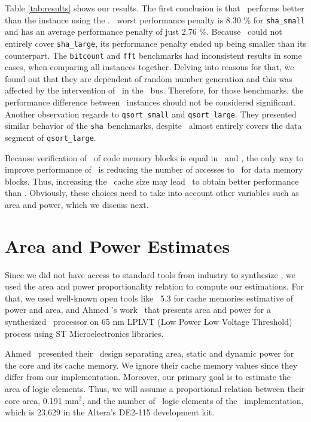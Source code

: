 Table \ref{tab:results} shows our results. The first conclusion is that \timestamp~performs better than the instance using the \mt. \timestamp~worst performance penalty is 8.30 \% for \texttt{sha\_small} and has an average performance penalty of just 2.76 \%. Because \cshia~could not entirely cover \texttt{sha\_large}, its performance penalty ended up being smaller than its counterpart. The \texttt{bitcount} and \texttt{fft} benchmarks had inconsistent results in some cases, when comparing all instances together. Delving into reasons for that, we found out that they are dependent of random number generation and this was affected by the intervention of \cshia~in the \amba~bus. Therefore, for those benchmarks, the performance difference between \cshia~instances should not be considered significant. Another observation regards to \texttt{qsort\_small} and \texttt{qsort\_large}. They presented similar behavior of the \texttt{sha}~benchmarks, despite \cshia~almost entirely covers the data segment of \texttt{qsort\_large}. 

Because verification of \ptags~of code memory blocks is equal in \timestamp~and \cshiamt, the only way to improve performance of \cshia~is reducing the number of accesses to \ptagmem~for data memory blocks. Thus, increasing the \ptag~cache size may lead \cshiamt~to obtain better performance than \timestamp. Obviously, these choices need to take into account other variables such as area and power, which we discuss next.

\section{Area and Power Estimates}
\label{subsec:Power-and-Area-Estimative}

Since we did not have access to standard tools from industry to synthesize \vhdl, we used the area and power proportionality relation \cite{Nemani1999:Area-Power} to compute our estimations. For that, we used well-known open tools like \cacti~5.3 \cite{HP:Cacti53} for cache memories estimative of power and area, and Ahmed \etal's work~\cite{Ahmed2009:Leon} that presents area and power for a synthesized \leon~processor on 65 nm LPLVT (Low Power Low Voltage Threshold) process using ST Microelectronics libraries.

Ahmed \etal~presented their \leon~design separating area, static and dynamic power for the core and its cache memory. We ignore their cache memory values since they differ from our implementation. Moreover, our primary goal is to estimate the area of logic elements. Thus, we will assume a proportional relation between their core area, 0.191 mm$^{2}$, and the number of \fpga~logic elements of the \baseline~implementation, which is 23,629 in the Altera's DE2-115 development kit. %

